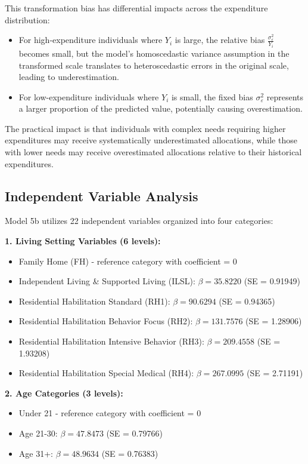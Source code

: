 This transformation bias has differential impacts across the expenditure distribution:
\begin{itemize}
    \item For high-expenditure individuals where $Y_i$ is large, the relative bias $\frac{\sigma^2_{\varepsilon}}{Y_i}$ becomes small, but the model's homoscedastic variance assumption in the transformed scale translates to heteroscedastic errors in the original scale, leading to underestimation.
    \item For low-expenditure individuals where $Y_i$ is small, the fixed bias $\sigma^2_{\varepsilon}$ represents a larger proportion of the predicted value, potentially causing overestimation.
\end{itemize}

The practical impact is that individuals with complex needs requiring higher expenditures may receive systematically underestimated allocations, while those with lower needs may receive overestimated allocations relative to their historical expenditures.

\subsection{Independent Variable Analysis}

Model 5b utilizes 22 independent variables organized into four categories:

\textbf{1. Living Setting Variables (6 levels):}
\begin{itemize}
    \item Family Home (FH) - reference category with coefficient = 0
    \item Independent Living \& Supported Living (ILSL): $\beta = 35.8220$ (SE = 0.91949)
    \item Residential Habilitation Standard (RH1): $\beta = 90.6294$ (SE = 0.94365)
    \item Residential Habilitation Behavior Focus (RH2): $\beta = 131.7576$ (SE = 1.28906)
    \item Residential Habilitation Intensive Behavior (RH3): $\beta = 209.4558$ (SE = 1.93208)
    \item Residential Habilitation Special Medical (RH4): $\beta = 267.0995$ (SE = 2.71191)
\end{itemize}

\textbf{2. Age Categories (3 levels):}
\begin{itemize}
    \item Under 21 - reference category with coefficient = 0
    \item Age 21-30: $\beta = 47.8473$ (SE = 0.79766)
    \item Age 31+: $\beta = 48.9634$ (SE = 0.76383)
\end{itemize}

